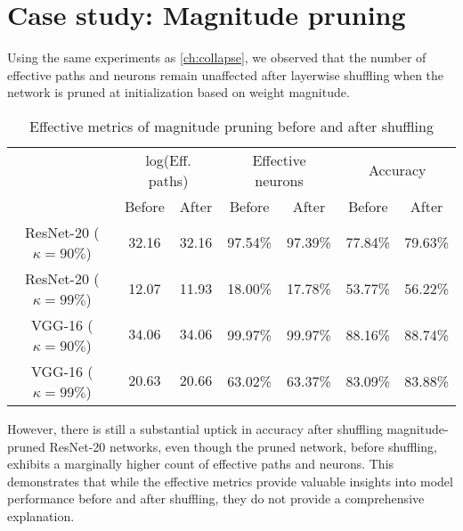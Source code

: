 \section{Case study: Magnitude pruning}
Using the same experiments as \autoref{ch:collapse}, we observed that the number of effective paths and neurons remain unaffected after layerwise shuffling when the network is pruned at initialization based on weight magnitude. 
\begin{table}[h!]
\centering
\begin{tabular}{|c|cc|cc|cc|}
\hline
\multirow{2}{*}{} & \multicolumn{2}{c|}{log(Eff. paths)} & \multicolumn{2}{c|}{Effective neurons} & \multicolumn{2}{c|}{Accuracy} \\ \cline{2-7} 
                  & Before            & After            & Before             & After             & Before        & After         \\ \hline
ResNet-20 ($\kappa=90\%$)        & 32.16             & 32.16            & 97.54\%     & 97.39\%    & 77.84\%       & 79.63\%       \\ \hline
ResNet-20 ($\kappa=99\%$)        & 12.07             & 11.93            & 18.00\%     & 17.78\%    & 53.77\%       & 56.22\%    \\ \hline
VGG-16 ($\kappa=90\%$)           &  $34.06$         & $34.06$        & 99.97\%    & 99.97\%   &  88.16\%     & 88.74\%      \\ \hline
VGG-16 ($\kappa=99\%$)           &  $20.63$         & $20.66$        & 63.02\%    & 63.37\%   & 83.09\%       & 83.88\%       \\ \hline
\end{tabular}
\caption{Effective metrics of magnitude pruning before and after shuffling}
\label{table:mag}
\end{table}

However, there is still a substantial uptick in accuracy after shuffling magnitude-pruned ResNet-20 networks, even though the pruned network, before shuffling, exhibits a marginally higher count of effective paths and neurons. This demonstrates that while the effective metrics provide valuable insights into model performance before and after shuffling, they do not provide a comprehensive explanation.


